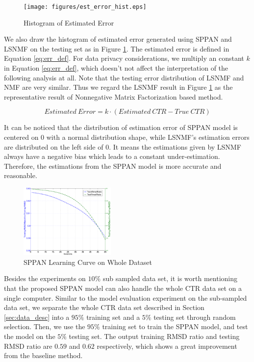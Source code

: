 \documentclass[conference,compsoc]{IEEEtran}
\begin{document}
\begin{figure}[!ht]
  \centering
  \texttt{[image: figures/est\_error\_hist.eps]}
  \caption{Histogram of Estimated Error}
  \label{fig:est_err}
\end{figure}

We also draw the histogram of estimated error generated using SPPAN and LSNMF on the testing set as in Figure \ref{fig:est_err}. The estimated error is defined in Equation \ref{eq:err_def}. For data privacy considerations, we multiply an constant $k$ in Equation \ref{eq:err_def}, which doesn't not affect the interpretation of the following analysis at all. Note that the testing error distribution of LSNMF and NMF are very similar. Thus we regard the LSNMF result in Figure \ref{fig:est_err} as the representative result of Nonnegative Matrix Factorization based method.

\begin{equation}
\label{eq:err_def}
Estimated~Error=k\cdot(Estimated~CTR - True~CTR)
\end{equation}

It can be noticed that the distribution of estimation error of SPPAN model is centered on 0 with a normal distribution shape, while LSNMF's estimation errors are distributed on the left side of 0. It means the estimations given by LSNMF always have a negative bias which leads to a constant under-estimation. Therefore, the estimations from the SPPAN model is more accurate and reasonable.


\begin{figure}[!ht]
  \centering
  \includegraphics[width=0.42\textwidth]{figures/learning_curve_sppan_whole_relative.eps}
  \caption{SPPAN Learning Curve on Whole Dataset}
  \label{fig:sppan_curve_whole}
\end{figure}

Besides the experiments on $10\%$ sub sampled data set, it is worth mentioning that the proposed SPPAN model can also handle the whole CTR data set on a single computer. Similar to the model evaluation experiment on the sub-sampled data set, we separate the whole CTR data set described in Section \ref{sec:data_desc} into a $95\%$ training set and a $5\%$ testing set through random selection. Then, we use the $95\%$ training set to train the SPPAN model, and test the model on the $5\%$ testing set. The output training RMSD ratio and testing RMSD ratio are $0.59$ and $0.62$ respectively, which shows a great improvement from the baseline method. 
\end{document}

